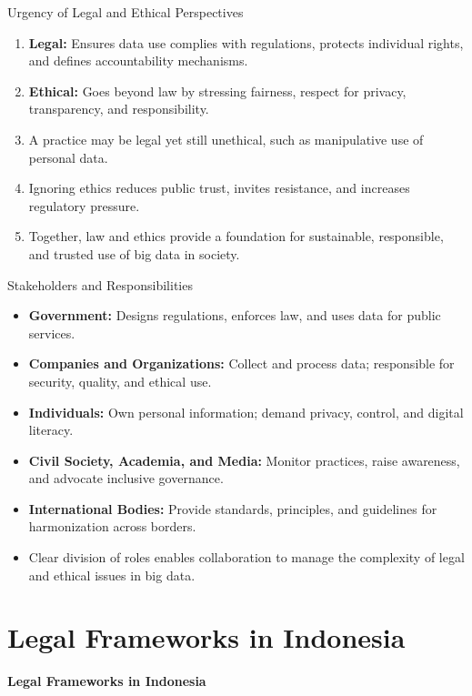 \documentclass[aspectratio=169, table]{beamer}
\begin{document}
\begin{frame}{Urgency of Legal and Ethical Perspectives}
	\vspace{20pt}
	\begin{enumerate}
		\item \textbf{Legal:} Ensures data use complies with regulations, protects individual rights, and defines accountability mechanisms.  
		\item \textbf{Ethical:} Goes beyond law by stressing fairness, respect for privacy, transparency, and responsibility.  
		\item A practice may be legal yet still unethical, such as manipulative use of personal data.  
		\item Ignoring ethics reduces public trust, invites resistance, and increases regulatory pressure.  
		\item Together, law and ethics provide a foundation for sustainable, responsible, and trusted use of big data in society.  
	\end{enumerate}
\end{frame}

\begin{frame}{Stakeholders and Responsibilities}
	\vspace{20pt}
	\begin{itemize}
		\item \textbf{Government:} Designs regulations, enforces law, and uses data for public services.  
		\item \textbf{Companies and Organizations:} Collect and process data; responsible for security, quality, and ethical use.  
		\item \textbf{Individuals:} Own personal information; demand privacy, control, and digital literacy.  
		\item \textbf{Civil Society, Academia, and Media:} Monitor practices, raise awareness, and advocate inclusive governance.  
		\item \textbf{International Bodies:} Provide standards, principles, and guidelines for harmonization across borders.  
		\item Clear division of roles enables collaboration to manage the complexity of legal and ethical issues in big data.  
	\end{itemize}
\end{frame}

\section{Legal Frameworks in Indonesia}
\begin{frame}{\hfill}
	\centering
	\Huge{\textbf{Legal Frameworks in Indonesia}}
\end{frame}
\end{document}
